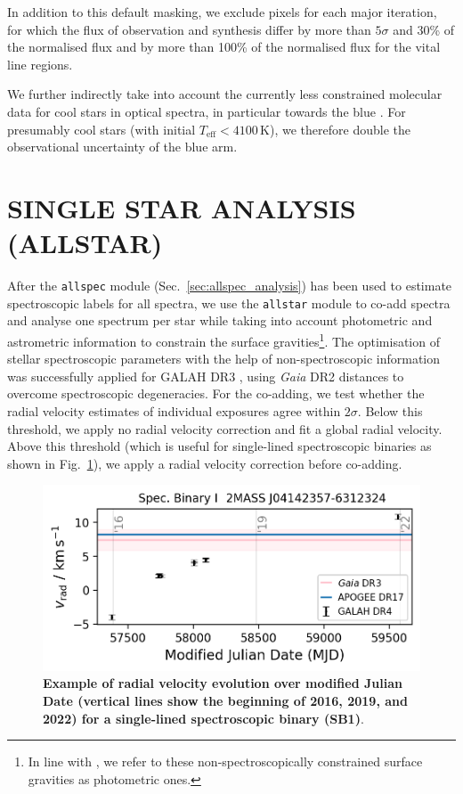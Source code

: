\documentclass[
  journal=pasa,
  manuscript=research-paper, %
  year=2024,
  volume=37
]{cup-journal}
\newcommand{\adjusted}[1]{{\textcolor{purple}{#1}}}
\newcommand{\Gaia}{\textit{Gaia}\xspace}
\begin{document}
In addition to this default masking, we exclude pixels for each major iteration, for which the flux of observation and synthesis differ by more than $5 \sigma$ and 30\% of the normalised flux and by more than 100\% of the normalised flux for the vital line regions.

We further indirectly take into account the currently less constrained molecular data for cool stars in optical spectra, in particular towards the blue \citep[e.g.][]{Rains2021,Rains2024}. For presumably cool stars (with initial $T_\text{eff} < 4100\,\mathrm{K}$), we therefore double the observational uncertainty of the blue arm.

\section{SINGLE STAR ANALYSIS (ALLSTAR)}
\label{sec:allstar_analysis}

After the \texttt{allspec} module (Sec.~\ref{sec:allspec_analysis}) has been used to estimate spectroscopic labels for all spectra, we use the \texttt{allstar} module to co-add spectra and analyse one spectrum per star while taking into account photometric and astrometric information to constrain the surface gravities\adjusted{\footnote{In line with \citet{Nissen2015, Nissen2020}, we refer to these non-spectroscopically constrained surface gravities as photometric ones.}}. The optimisation of stellar spectroscopic parameters with the help of non-spectroscopic information was successfully applied for GALAH DR3 \citep{Buder2021}, using \Gaia DR2 distances \citep{BailerJones2018} to overcome spectroscopic degeneracies. For the co-adding, we test whether the radial velocity estimates of individual exposures agree within $2\sigma$. Below this threshold, we apply no radial velocity correction and fit a global radial velocity. Above this threshold (which is useful for single-lined spectroscopic binaries as shown in Fig.~\ref{fig:examples_flag_sp_2}), we apply a radial velocity correction before co-adding.

\begin{figure}[ht]
 \centering
 \includegraphics[width=\textwidth]{figures/examples_flag_sp_2.png}
 \caption{\textbf{Example of radial velocity evolution over modified Julian Date (vertical lines show the beginning of 2016, 2019, and 2022) for a single-lined spectroscopic binary (SB1)}.}
 \label{fig:examples_flag_sp_2}
\end{figure}
\end{document}
